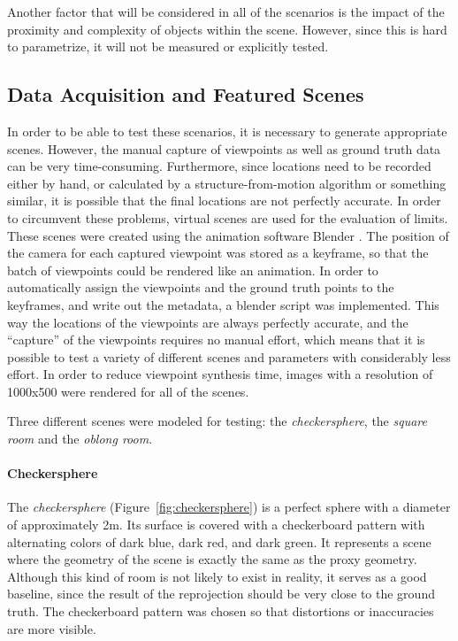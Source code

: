 Another factor that will be considered in all of the scenarios is the impact of the proximity and complexity of objects within the scene. However, since this is hard to parametrize, it will not be measured or explicitly tested.


\subsection{Data Acquisition and Featured Scenes} \label{subsec:data_acquisition}
In order to be able to test these scenarios, it is necessary to generate appropriate scenes. However, the manual capture of viewpoints as well as ground truth data can be very time-consuming. Furthermore, since locations need to be recorded either by hand, or calculated by a structure-from-motion algorithm or something similar, it is possible that the final locations are not perfectly accurate. In order to circumvent these problems, virtual scenes are used for the evaluation of limits. These scenes were created using the animation software Blender \cite{blender}. The position of the camera for each captured viewpoint was stored as a keyframe, so that the batch of viewpoints could be rendered like an animation. In order to automatically assign the viewpoints and the ground truth points to the keyframes, and write out the metadata, a blender script was implemented. This way the locations of the viewpoints are always perfectly accurate, and the ``capture'' of the viewpoints requires no manual effort, which means that it is possible to test a variety of different scenes and parameters with considerably less effort. In order to reduce viewpoint synthesis time, images with a resolution of 1000x500 were rendered for all of the scenes.

Three different scenes were modeled for testing: the \emph{checkersphere}, the \emph{square room} and the \emph{oblong room}.%

\paragraph{Checkersphere}
The \emph{checkersphere} (Figure~\ref{fig:checkersphere}) is a perfect sphere with a diameter of approximately 2m. Its surface is covered with a checkerboard pattern with alternating colors of dark blue, dark red, and dark green. It represents a scene where the geometry of the scene is exactly the same as the proxy geometry. Although this kind of room is not likely to exist in reality, it serves as a good baseline, since the result of the reprojection should be very close to the ground truth. The checkerboard pattern was chosen so that distortions or inaccuracies are more visible.


